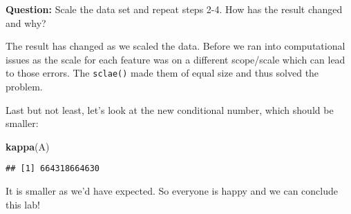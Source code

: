 \documentclass[]{article}
\newenvironment{Shaded}{\begin{snugshade}}{\end{snugshade}}
\newcommand{\KeywordTok}[1]{\textcolor[rgb]{0.13,0.29,0.53}{\textbf{#1}}}
\newcommand{\DecValTok}[1]{\textcolor[rgb]{0.00,0.00,0.81}{#1}}
\newcommand{\StringTok}[1]{\textcolor[rgb]{0.31,0.60,0.02}{#1}}
\newcommand{\OperatorTok}[1]{\textcolor[rgb]{0.81,0.36,0.00}{\textbf{#1}}}
\newcommand{\NormalTok}[1]{#1}
\begin{document}
\textbf{Question:} Scale the data set and repeat steps 2-4. How has the
result changed and why?

\begin{Shaded}
\end{Shaded}

The result has changed as we scaled the data. Before we ran into
computational issues as the scale for each feature was on a different
scope/scale which can lead to those errors. The \texttt{sclae()} made
them of equal size and thus solved the problem.

Last but not least, let's look at the new conditional number, which
should be smaller:

\begin{Shaded}
\begin{Highlighting}[]
\KeywordTok{kappa}\NormalTok{(A)}
\end{Highlighting}
\end{Shaded}

\begin{verbatim}
## [1] 664318664630
\end{verbatim}

It is smaller as we'd have expected. So everyone is happy and we can
conclude this lab!
\end{document}
